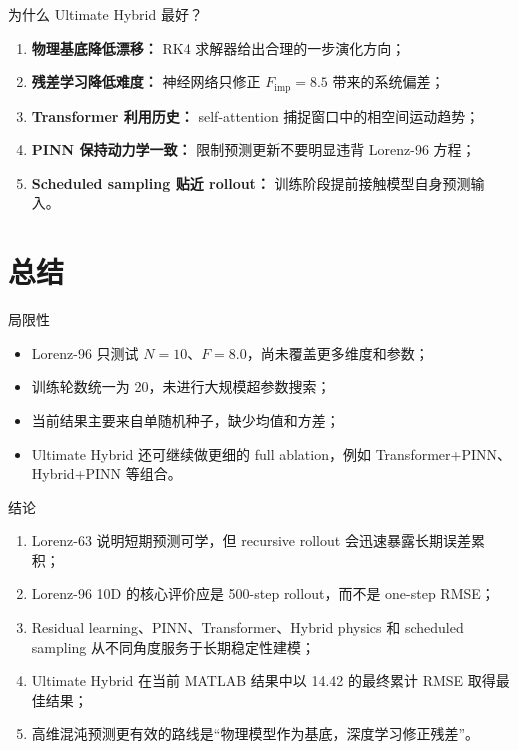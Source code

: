 \documentclass[UTF8,aspectratio=169,11pt]{ctexbeamer}
\begin{document}
\begin{frame}{为什么 Ultimate Hybrid 最好？}
    \begin{enumerate}
        \item \textbf{物理基底降低漂移：} RK4 求解器给出合理的一步演化方向；
        \item \textbf{残差学习降低难度：} 神经网络只修正 $F_{\mathrm{imp}}=8.5$ 带来的系统偏差；
        \item \textbf{Transformer 利用历史：} self-attention 捕捉窗口中的相空间运动趋势；
        \item \textbf{PINN 保持动力学一致：} 限制预测更新不要明显违背 Lorenz-96 方程；
        \item \textbf{Scheduled sampling 贴近 rollout：} 训练阶段提前接触模型自身预测输入。
    \end{enumerate}
\end{frame}

\section{总结}

\begin{frame}{局限性}
    \begin{itemize}
        \item Lorenz-96 只测试 $N=10$、$F=8.0$，尚未覆盖更多维度和参数；
        \item 训练轮数统一为 20，未进行大规模超参数搜索；
        \item 当前结果主要来自单随机种子，缺少均值和方差；
        \item Ultimate Hybrid 还可继续做更细的 full ablation，例如 Transformer+PINN、Hybrid+PINN 等组合。
    \end{itemize}
\end{frame}

\begin{frame}{结论}
    \begin{enumerate}
        \item Lorenz-63 说明短期预测可学，但 recursive rollout 会迅速暴露长期误差累积；
        \item Lorenz-96 10D 的核心评价应是 500-step rollout，而不是 one-step RMSE；
        \item Residual learning、PINN、Transformer、Hybrid physics 和 scheduled sampling 从不同角度服务于长期稳定性建模；
        \item Ultimate Hybrid 在当前 MATLAB 结果中以 14.42 的最终累计 RMSE 取得最佳结果；
        \item 高维混沌预测更有效的路线是“物理模型作为基底，深度学习修正残差”。
    \end{enumerate}
\end{frame}
\end{document}

